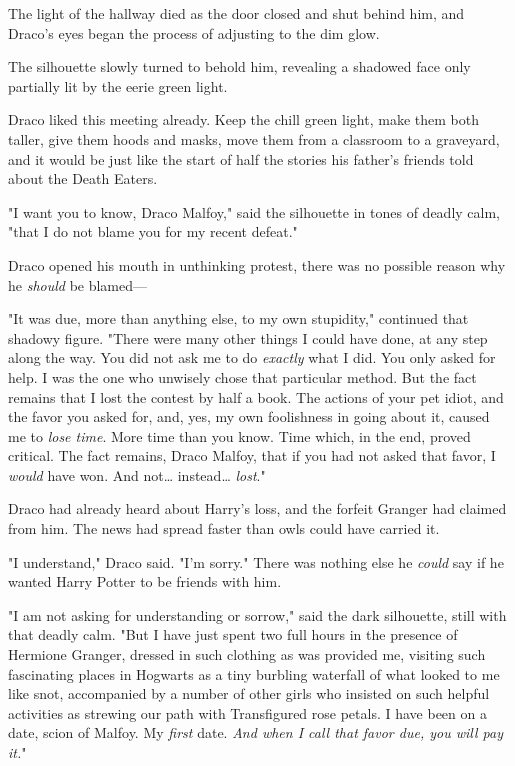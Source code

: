 The light of the hallway died as the door closed and shut behind him, and
Draco's eyes began the process of adjusting to the dim glow.

The silhouette slowly turned to behold him, revealing a shadowed face only
partially lit by the eerie green light.

Draco liked this meeting already. Keep the chill green light, make them both
taller, give them hoods and masks, move them from a classroom to a graveyard,
and it would be just like the start of half the stories his father's friends
told about the Death Eaters.

"I want you to know, Draco Malfoy," said the silhouette in tones of deadly
calm, "that I do not blame you for my recent defeat."

Draco opened his mouth in unthinking protest, there was no possible reason why
he \emph{should} be blamed---

"It was due, more than anything else, to my own stupidity," continued that
shadowy figure. "There were many other things I could have done, at any step
along the way. You did not ask me to do \emph{exactly} what I did. You only
asked for help. I was the one who unwisely chose that particular method. But
the fact remains that I lost the contest by half a book. The actions of your
pet idiot, and the favor you asked for, and, yes, my own foolishness in going
about it, caused me to \emph{lose time}. More time than you know. Time which,
in the end, proved critical. The fact remains, Draco Malfoy, that if you had
not asked that favor, I \emph{would} have won. And not{\ldots} instead{\ldots}
\emph{lost}."

Draco had already heard about Harry's loss, and the forfeit Granger had claimed
from him. The news had spread faster than owls could have carried it.

"I understand," Draco said. "I'm sorry." There was nothing else he \emph{could}
say if he wanted Harry Potter to be friends with him.

"I am not asking for understanding or sorrow," said the dark silhouette, still
with that deadly calm. "But I have just spent two full hours in the presence of
Hermione Granger, dressed in such clothing as was provided me, visiting such
fascinating places in Hogwarts as a tiny burbling waterfall of what looked to
me like snot, accompanied by a number of other girls who insisted on such
helpful activities as strewing our path with Transfigured rose petals. I have
been on a date, scion of Malfoy. My \emph{first} date. \emph{And when I call
that favor due, you will pay it.}"

